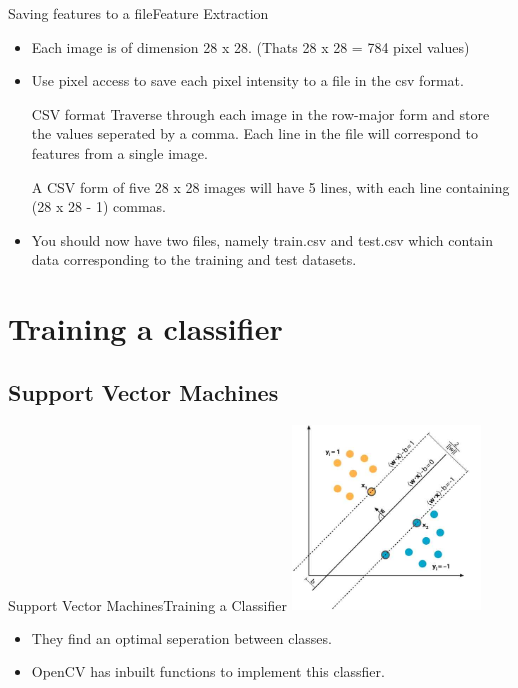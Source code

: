 \documentclass{beamer}
\begin{document}
\begin{frame}{Saving features to a file}{Feature Extraction}
  \begin{itemize}
  \item{
    Each image is of dimension 28 x 28. (Thats 28 x 28 = 784 pixel values)
  }
  \pause
  \item{   
    Use pixel access to save each pixel intensity to a file in the csv format.
  }
  \pause
  \begin{block}{CSV format}
      Traverse through each image in the row-major form and store the values seperated by
      a comma. Each line in the file will correspond to features from a single image.
      \begin{example}
        A CSV form of five 28 x 28 images will have 5 lines, with each line containing
        (28 x 28 - 1) commas.
      \end{example}
  \end{block}
  \pause
  \item You should now have two files, namely train.csv and test.csv which contain data 
  corresponding to the training and test datasets.
  \end{itemize}
\end{frame}

\section{Training a classifier}

\subsection{Support Vector Machines}
\begin{frame}{Support Vector Machines}{Training a Classifier}
    \centering
        \includegraphics[width=50mm]{./images/svm.jpg}

\begin{itemize}
    \item They find an optimal seperation between classes.
    \item OpenCV has inbuilt functions to implement this classfier.
\end{itemize}
\end{frame}
\end{document}
